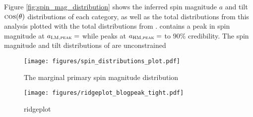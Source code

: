 Figure \ref{fig:spin_mag_distribution} shows the inferred spin magnitude $a$ and tilt $\textsc{cos}(\theta)$ distributions of each category, as well as the total distributions from this analysis plotted with the total distributions from . \first{} contains a peak in spin magnitude at $a_{\textsc{LM,peak}} = $\result{$\CIPlusMinus{\macros[SpinMag][LowMassPeak][max]}$} while \second{} peaks at $a_{\textsc{HM,peak}} = $\result{$\CIPlusMinus{\macros[SpinMag][HighMassPeak][max]}$} to $90\%$ credibility. The spin magnitude and tilt distributions of \cont{} are unconstrained 

\begin{figure*}[ht!]
    \begin{centering}
        \texttt{[image: figures/spin\_distributions\_plot.pdf]}
        \caption{The marginal primary spin magnitude distribution}
        \label{fig:spin_distributions}
    \end{centering}
\end{figure*}

\begin{figure*}[ht!]
    \begin{centering}
        \texttt{[image: figures/ridgeplot\_blogpeak\_tight.pdf]}
        \caption{ridgeplot}
        \label{fig:ridgeplot}
    \end{centering}
\end{figure*}



